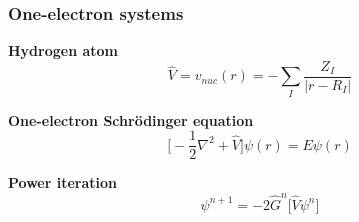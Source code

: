 \begin{frame}
    \frametitle{One-electron systems}
    \centering
    \textbf{Hydrogen atom}
    \begin{equation}
	\nonumber
	\hat{V} = v_{nuc}(r) = -\sum_I\frac{Z_I}{|r-R_I|}
    \end{equation}
    \vspace{5mm}


    \textbf{One-electron Schr\"{o}dinger equation}
    \begin{equation}
        \nonumber
        \Big[-\frac{1}{2}\nabla^2 + \hat{V}\Big]\psi(r) = E \psi(r)
    \end{equation}
    \vspace{5mm}

    \textbf{Power iteration}
    \begin{equation}
        \nonumber
        \psi^{n+1} = -2\hat{G}^n \Big[\hat{V} \psi^n \Big]
    \end{equation}
%
\end{frame}

%
%
%
%
%
%
%

